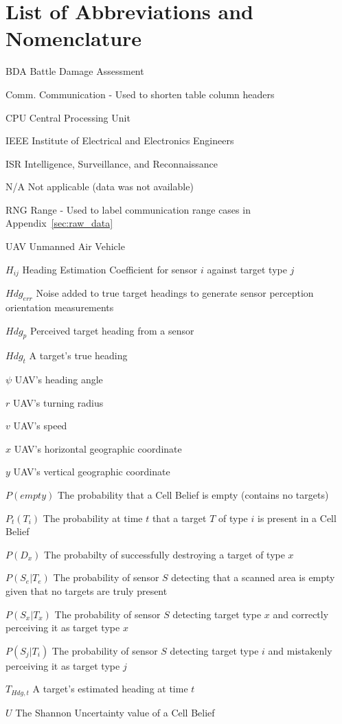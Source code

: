 \chapter*{List of Abbreviations and Nomenclature}
\begin{abbrv}
\item[BDA]				Battle Damage Assessment
\item[Comm.]            Communication - Used to shorten table column headers
\item[CPU]				Central Processing Unit
\item[IEEE]				Institute of Electrical and Electronics Engineers
\item[ISR]              Intelligence, Surveillance, and Reconnaissance
\item[N/A]              Not applicable (data was not available)
\item[RNG]              Range - Used to label communication range cases in Appendix~\ref{sec:raw_data}
\item[UAV]				Unmanned Air Vehicle
\item[$H_{ij}$] 		Heading Estimation Coefficient for sensor $i$ against target type $j$
\item[$Hdg_{err}$]      Noise added to true target headings to generate sensor perception orientation measurements
\item[$Hdg_{p}$]        Perceived target heading from a sensor
\item[$Hdg_{t}$]        A target's true heading
\item[$\psi$]           UAV's heading angle
\item[$r$]              UAV's turning radius
\item[$v$] 				UAV's speed
\item[$x$]			    UAV's horizontal geographic coordinate
\item[$y$]			    UAV's vertical geographic coordinate
\item[$P(empty)$] 		The probability that a Cell Belief is empty (contains no targets)
\item[$P_{t}(T_{i})$]   The probability at time $t$ that a target $T$ of type $i$ is present in a Cell Belief
\item[$P(D_{x})$]       The probabilty of successfully destroying a target of type $x$
\item[$P(S_{e}|T_{e})$] The probability of sensor $S$ detecting that a scanned area is empty given that no targets are truly present
\item[$P(S_{x}|T_{x})$] The probability of sensor $S$ detecting target type $x$ and correctly perceiving it as target type $x$
\item[$P(S_{j}|T_{i})$] The probability of sensor $S$ detecting target type $i$ and mistakenly perceiving it as target type $j$
\item[$T_{Hdg,t}$]      A target's estimated heading at time $t$
\item[$U$]              The Shannon Uncertainty value of a Cell Belief
\end{abbrv}